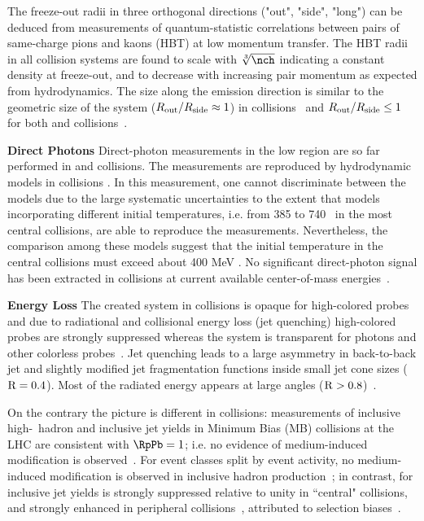\documentclass[../report.tex]{subfiles}
\begin{document}
The freeze-out radii in three orthogonal directions ("out", "side", "long") can be deduced from measurements of quantum-statistic correlations between pairs of same-charge pions and kaons (HBT) at low momentum transfer. The HBT radii in all collision systems are found to scale with $\sqrt[3]{\nch}$ indicating a constant density at freeze-out, and to decrease with increasing pair momentum \kT as expected from hydrodynamics. The size along the emission direction is similar to the geometric size of the system ($R_{\rm out}/R_{\rm side} \approx 1$) in \PbPb collisions~\cite{Adam:2015vna,Adam:2015vja,Abelev:2014pja,CMS:2014mla,Acharya:2017qtq,Acharya:2017qtq} and $R_{\rm out}/R_{\rm side} \leq 1$ for both \pPb and \pp collisions~\cite{Abelev:2014pja,Adam:2015pya,Aamodt:2011kd,CMS:2014mla,Aaboud:2017xpw}.

\textbf{Direct Photons}
Direct-photon measurements in the low \pT region are so far performed in \PbPb and \pp collisions. The measurements are reproduced by hydrodynamic models in \PbPb collisions \cite{Adam:2015lda}. In this measurement, one cannot discriminate between the models due to the large systematic uncertainties to the extent that models incorporating different initial temperatures, i.e. from 385 to 740 \UMeV\ in the most central \PbPb collisions, are able to reproduce the measurements. Nevertheless, the comparison among these models suggest that the initial temperature in the central \PbPb collisions must exceed about 400 MeV \cite{Adam:2015lda}. No significant direct-photon signal has been extracted in \pp collisions at current available center-of-mass energies~\cite{Acharya:2018dqe}.

\textbf{Energy Loss}
The created system in \PbPb collisions is opaque for high-\pT colored probes and due to radiational and collisional energy loss (jet quenching) high-\pT colored probes are strongly suppressed whereas the system is transparent for photons and other colorless probes~\cite{}. Jet quenching leads to a large asymmetry in back-to-back jet \pT and slightly modified jet fragmentation functions inside small jet cone sizes ($\rm{R} = 0.4$). Most of the radiated energy appears at large angles ($\rm{R} > 0.8$)~\cite{}.

On the contrary the picture is different in \pPb collisions: measurements of inclusive high-\pT\ hadron and inclusive jet yields in Minimum Bias (MB) \pPb collisions at the LHC are consistent with $\RpPb = 1$; i.e. no evidence of medium-induced modification is observed~\cite{}. For event classes split by event activity, no medium-induced modification is observed in inclusive hadron production~\cite{}; in contrast, for inclusive jet yields \RpPb is strongly suppressed relative to unity in ``central" \pPb collisions, and strongly enhanced in peripheral \pPb collisions~\cite{}, attributed to selection biases~\cite{Acharya:2017okq}. 
\end{document}
